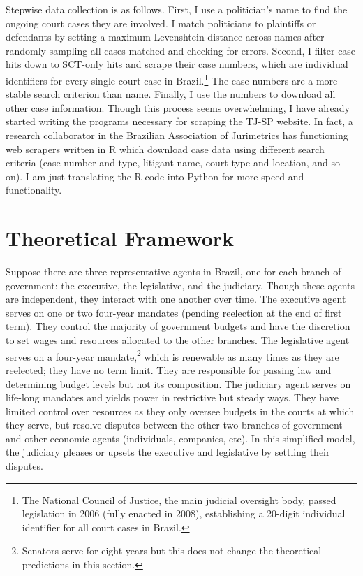 \documentclass[11pt]{article}
\begin{document}
Stepwise data collection is as follows. First, I use a politician's name to find the ongoing court cases they are involved. I match politicians to plaintiffs or defendants by setting a maximum Levenshtein distance across names after randomly sampling all cases matched and checking for errors. Second, I filter case hits down to SCT-only hits and scrape their case numbers, which are individual identifiers for every single court case in Brazil.\footnote{The National Council of Justice, the main judicial oversight body, passed legislation in 2006 (fully enacted in 2008), establishing a 20-digit individual identifier for all court cases in Brazil.} The case numbers are a more stable search criterion than name. Finally, I use the numbers to download all other case information. Though this process seems overwhelming, I have already started writing the programs necessary for scraping the TJ-SP website. In fact, a research collaborator in the Brazilian Association of Jurimetrics has functioning web scrapers written in R which download case data using different search criteria (case number and type, litigant name, court type and location, and so on). I am just translating the R code into Python for more speed and functionality.

\section{Theoretical Framework} \label{sec:theory_paper2}

Suppose there are three representative agents in Brazil, one for each branch of government: the executive, the legislative, and the judiciary. Though these agents are independent, they interact with one another over time. The executive agent serves on one or two four-year mandates (pending reelection at the end of first term). They control the majority of government budgets and have the discretion to set wages and resources allocated to the other branches. The legislative agent serves on a four-year mandate,\footnote{Senators serve for eight years but this does not change the theoretical predictions in this section.} which is renewable as many times as they are reelected; they have no term limit. They are responsible for passing law and determining budget levels but not its composition. The judiciary agent serves on life-long mandates and yields power in restrictive but steady ways. They have limited control over resources as they only oversee budgets in the courts at which they serve, but resolve disputes between the other two branches of government and other economic agents (individuals, companies, etc). In this simplified model, the judiciary pleases or upsets the executive and legislative by settling their disputes.
\end{document}
